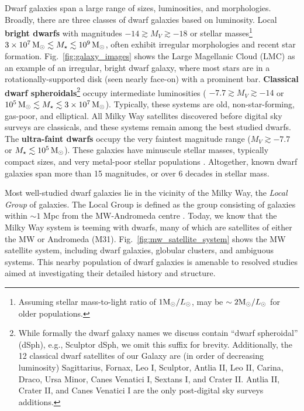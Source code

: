 Dwarf galaxies span a large range of sizes, luminosities, and
morphologies. Broadly, there are three classes of dwarf galaxies based
on luminosity. Local \textbf{bright dwarfs} with magnitudes
\(-14 \gtrsim M_V \gtrsim  -18\) or stellar masses\footnote{Assuming
  stellar mass-to-light ratio of \(1 {\rm M}_{\odot} / L_{\odot}\), may be
  \(\sim 2 {\rm M}_{\odot}/L_\odot\) for older populations.}
\(3\times10^7\,{\rm M}_{\odot} \lesssim M_\star \lesssim 10^9\,{\rm M}_{\odot}\), often exhibit
irregular morphologies and recent star formation.
Fig.~\ref{fig:galaxy_images} shows the Large Magellanic Cloud (LMC) as
an example of an irregular, bright dwarf galaxy, where most stars are in
a rotationally-supported disk (seen nearly face-on) with a prominent
bar. \textbf{Classical dwarf spheroidals}\footnote{While formally the
  dwarf galaxy names we discuss contain ``dwarf spheroidal'' (dSph),
  e.g., Sculptor dSph, we omit this suffix for brevity. Additionally,
  the 12 classical dwarf satellites of our Galaxy are (in order of
  decreasing luminosity) Sagittarius, Fornax, Leo I, Sculptor, Antlia
  II, Leo II, Carina, Draco, Ursa Minor, Canes Venatici I, Sextans I,
  and Crater II. Antlia II, Crater II, and Canes Venatici I are the only
  post-digital sky surveys additions.} occupy intermediate luminosities
( \(-7.7 \gtrsim M_V  \gtrsim -14\) or
\(10^5\,{\rm M}_{\odot} \lesssim M_\star \lesssim 3\times10^7\,{\rm M}_{\odot}\)). Typically,
these systems are old, non-star-forming, gas-poor, and elliptical. All
Milky Way satellites discovered before digital sky surveys are
classicals, and these systems remain among the best studied dwarfs. The
\textbf{ultra-faint dwarfs} occupy the very faintest magnitude range
(\(M_V \gtrsim -7.7\) or \(M_\star \lesssim 10^5\,{\rm M}_{\odot}\)). These galaxies
have minuscule stellar masses, typically compact sizes, and very
metal-poor stellar populations \citep[see the review by][]{simon2019}.
Altogether, known dwarf galaxies span more than 15 magnitudes, or over 6
decades in stellar mass.

Most well-studied dwarf galaxies lie in the vicinity of the Milky Way,
the \emph{Local Group} of galaxies. The Local Group is defined as the
group consisting of galaxies within \(\sim 1\) Mpc from the MW-Andromeda
centre \citep[e.g.,][ and references therein]{mcconnachie2012}. Today,
we know that the Milky Way system is teeming with dwarfs, many of which
are satellites of either the MW or Andromeda (M31).
Fig.~\ref{fig:mw_satellite_system} shows the MW satellite system,
including dwarf galaxies, globular clusters, and ambiguous systems. This
nearby population of dwarf galaxies is amenable to resolved studies
aimed at investigating their detailed history and structure.

